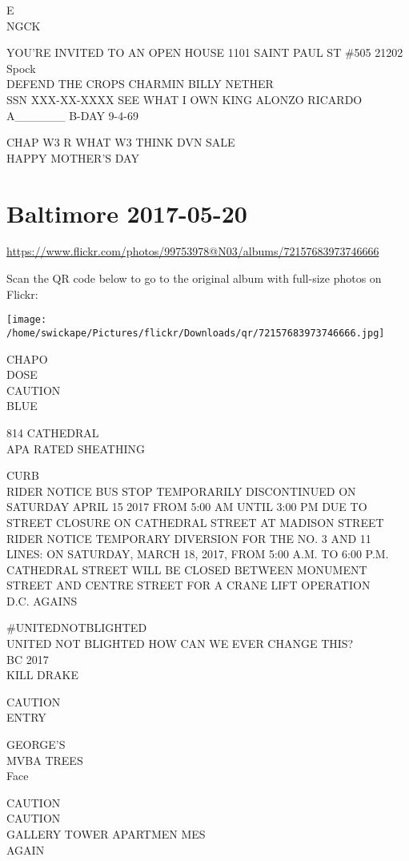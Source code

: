 \documentclass[10pt,letterpaper]{article}
\begin{document}
E\\
NGCK

YOU'RE INVITED TO AN OPEN HOUSE 1101 SAINT PAUL ST \#505 21202\\
Spock\\
DEFEND THE CROPS CHARMIN BILLY NETHER\\
SSN XXX{-}XX{-}XXXX SEE WHAT I OWN KING ALONZO RICARDO A\_\_\_\_\_\_ B{-}DAY 9{-}4{-}69

CHAP W3 R WHAT W3 THINK DVN SALE\\
HAPPY MOTHER'S DAY


\section*{Baltimore 2017-05-20}

\url{https://www.flickr.com/photos/99753978@N03/albums/72157683973746666}

Scan the QR code below to go to the original album with full-size photos on Flickr:

\texttt{[image: /home/swickape/Pictures/flickr/Downloads/qr/72157683973746666.jpg]}


CHAPO\\
DOSE\\
CAUTION\\
BLUE

814 CATHEDRAL\\
APA RATED SHEATHING

CURB\\
RIDER NOTICE BUS STOP TEMPORARILY DISCONTINUED ON SATURDAY APRIL 15 2017 FROM 5:00 AM UNTIL 3:00 PM DUE TO STREET CLOSURE ON CATHEDRAL STREET AT MADISON STREET\\
RIDER NOTICE TEMPORARY DIVERSION FOR THE NO. 3 AND 11 LINES: ON SATURDAY, MARCH 18, 2017, FROM 5:00 A.M. TO 6:00 P.M. CATHEDRAL STREET WILL BE CLOSED BETWEEN MONUMENT STREET AND CENTRE STREET FOR A CRANE LIFT OPERATION\\
D.C. AGAINS

\#UNITEDNOTBLIGHTED\\
UNITED NOT BLIGHTED HOW CAN WE EVER CHANGE THIS?\\
BC 2017\\
KILL DRAKE

CAUTION\\
ENTRY

GEORGE'S\\
MVBA TREES\\
Face

CAUTION\\
CAUTION\\
GALLERY TOWER APARTMEN MES\\
AGAIN
\end{document}
